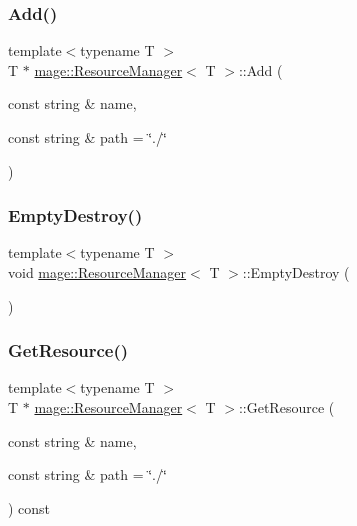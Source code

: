 \subsubsection{\texorpdfstring{Add()}{Add()}}
{\footnotesize\ttfamily template$<$typename T $>$ \\
T $\ast$ \hyperlink{classmage_1_1_resource_manager}{mage\+::\+Resource\+Manager}$<$ T $>$\+::Add (\begin{DoxyParamCaption}\item[{const string \&}]{name,  }\item[{const string \&}]{path = {\ttfamily \char`\"{}./\char`\"{}} }\end{DoxyParamCaption})}

\hypertarget{classmage_1_1_resource_manager_a4d2dbdff0c68b3a3eb8c847848546141}{}\label{classmage_1_1_resource_manager_a4d2dbdff0c68b3a3eb8c847848546141} 
\subsubsection{\texorpdfstring{Empty\+Destroy()}{EmptyDestroy()}}
{\footnotesize\ttfamily template$<$typename T $>$ \\
void \hyperlink{classmage_1_1_resource_manager}{mage\+::\+Resource\+Manager}$<$ T $>$\+::Empty\+Destroy (\begin{DoxyParamCaption}{ }\end{DoxyParamCaption})}

\hypertarget{classmage_1_1_resource_manager_ad22e0920555c376752b8448a81df59c6}{}\label{classmage_1_1_resource_manager_ad22e0920555c376752b8448a81df59c6} 
\subsubsection{\texorpdfstring{Get\+Resource()}{GetResource()}}
{\footnotesize\ttfamily template$<$typename T $>$ \\
T $\ast$ \hyperlink{classmage_1_1_resource_manager}{mage\+::\+Resource\+Manager}$<$ T $>$\+::Get\+Resource (\begin{DoxyParamCaption}\item[{const string \&}]{name,  }\item[{const string \&}]{path = {\ttfamily \char`\"{}./\char`\"{}} }\end{DoxyParamCaption}) const}

